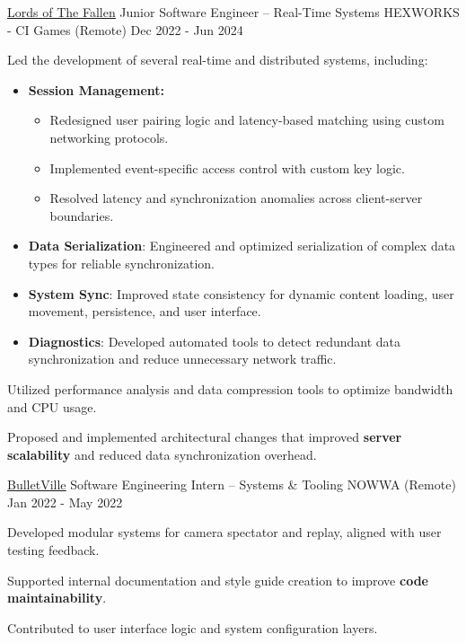 \begin{cventries}
  \cventry
    {\href{https://wizardcell.com/about/lords-of-the-fallen}{\underline{Lords of The Fallen}}}
    {Junior Software Engineer – Real-Time Systems}
    {HEXWORKS - CI Games (Remote)}
    {Dec 2022 - Jun 2024}
    {
      \begin{cvitems}
        \item {Led the development of several real-time and distributed systems, including:
          \begin{itemize}
            \item {\textbf{Session Management:}
              \begin{itemize}
                \item {Redesigned user pairing logic and latency-based matching using custom networking protocols.}
                \item {Implemented event-specific access control with custom key logic.}
                \item {Resolved latency and synchronization anomalies across client-server boundaries.}
              \end{itemize}
            }
            \item {\textbf{Data Serialization}: Engineered and optimized serialization of complex data types for reliable synchronization.}
            \item {\textbf{System Sync}: Improved state consistency for dynamic content loading, user movement, persistence, and user interface.}
            \item {\textbf{Diagnostics}: Developed automated tools to detect redundant data synchronization and reduce unnecessary network traffic.}
          \end{itemize}
        }
        \item {Utilized performance analysis and data compression tools to optimize bandwidth and CPU usage.}
        \item {Proposed and implemented architectural changes that improved \textbf{server scalability} and reduced data synchronization overhead.}
      \end{cvitems}
    }

  \cventry
    {\href{https://wizardcell.com/about/bulletville}{\underline{BulletVille}}}
    {Software Engineering Intern – Systems \& Tooling}
    {NOWWA (Remote)}
    {Jan 2022 - May 2022}
    {
      \begin{cvitems}
        \item {Developed modular systems for camera spectator and replay, aligned with user testing feedback.}
        \item {Supported internal documentation and style guide creation to improve \textbf{code maintainability}.}
        \item {Contributed to user interface logic and system configuration layers.}
      \end{cvitems}
    }


\end{cventries}
